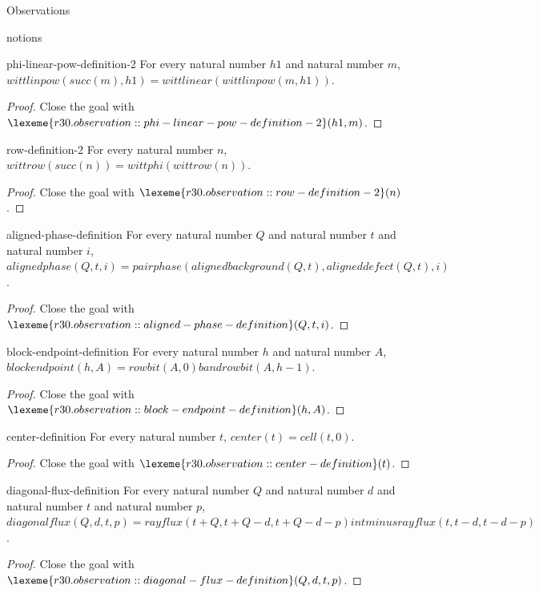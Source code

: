 \begin{lexlean}{Observations}
\begin{section}{notions}
\begin{lemma}{phi-linear-pow-definition-2}
For every natural number \(h1\) and natural number \(m\), \(wittlinpow(succ(m), h1) = wittlinear(wittlinpow(m, h1))\).
\begin{proof}
Close the goal with \(\lexeme{r30.observation::phi-linear-pow-definition-2}(h1, m)\).
\end{proof}
\end{lemma}

\begin{lemma}{row-definition-2}
For every natural number \(n\), \(wittrow(succ(n)) = wittphi(wittrow(n))\).
\begin{proof}
Close the goal with \(\lexeme{r30.observation::row-definition-2}(n)\).
\end{proof}
\end{lemma}

\begin{lemma}{aligned-phase-definition}
For every natural number \(Q\) and natural number \(t\) and natural number \(i\), \(alignedphase(Q, t, i) = pairphase(alignedbackground(Q, t), aligneddefect(Q, t), i)\).
\begin{proof}
Close the goal with \(\lexeme{r30.observation::aligned-phase-definition}(Q, t, i)\).
\end{proof}
\end{lemma}

\begin{lemma}{block-endpoint-definition}
For every natural number \(h\) and natural number \(A\), \(blockendpoint(h, A) = rowbit(A, 0) band rowbit(A, h - 1)\).
\begin{proof}
Close the goal with \(\lexeme{r30.observation::block-endpoint-definition}(h, A)\).
\end{proof}
\end{lemma}

\begin{lemma}{center-definition}
For every natural number \(t\), \(center(t) = cell(t, 0)\).
\begin{proof}
Close the goal with \(\lexeme{r30.observation::center-definition}(t)\).
\end{proof}
\end{lemma}

\begin{lemma}{diagonal-flux-definition}
For every natural number \(Q\) and natural number \(d\) and natural number \(t\) and natural number \(p\), \(diagonalflux(Q, d, t, p) = rayflux(t + Q, t + Q - d, t + Q - d - p) intminus rayflux(t, t - d, t - d - p)\).
\begin{proof}
Close the goal with \(\lexeme{r30.observation::diagonal-flux-definition}(Q, d, t, p)\).
\end{proof}
\end{lemma}


\end{section}
\end{lexlean}
